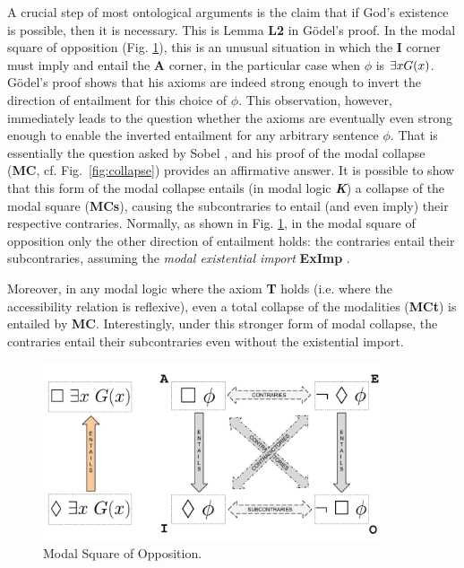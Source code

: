 \documentclass{birkmult}
\theoremstyle{definition}
\theoremstyle{remark}
\numberwithin{equation}{section}
\begin{document}
A crucial step of most ontological arguments is the claim that if
God's existence is possible, then it is necessary.  This is Lemma
\textbf{L2} in G\"odel's proof.  In the modal square of opposition
(Fig. \ref{fig:square}), this is an unusual situation in which the
\textbf{I} corner must imply and entail the \textbf{A} corner, 
in the particular case when $\phi$ is $\exists x G(x)$.  
G\"odel's proof shows that his axioms are indeed 
strong enough to invert the direction of
entailment for this choice of $\phi$.  
This observation, however, immediately leads 
to the question whether the axioms are eventually 
even strong enough to enable the inverted entailment
for any arbitrary sentence $\phi$.  
That is essentially the question asked by 
Sobel \cite{Sobel1987}, and his proof of the modal collapse
(\textbf{MC}, cf. Fig.~\ref{fig:collapse}) 
provides an affirmative answer. It is possible to show
that this form of the modal collapse entails (in modal logic
\textbf{\emph{K}}) a collapse of the modal square (\textbf{MCs}),
causing the subcontraries to entail 
(and even imply) their respective
contraries. Normally, as shown in Fig. \ref{fig:square}, 
in the modal square of opposition only the 
other direction of entailment holds: the
contraries entail their subcontraries, 
assuming the \emph{modal existential import} \textbf{ExImp}
\cite{ExImport}.

Moreover, in any modal logic where the axiom \textbf{T} holds
(i.e. where the accessibility relation is reflexive), 
even a total collapse of the modalities (\textbf{MCt}) 
is entailed by \textbf{MC}.
Interestingly, under this stronger form of modal
collapse, the contraries entail their subcontraries even 
without the existential import.

\begin{figure}[t]
\includegraphics[width=0.9\textwidth]{SquarePics/ModalSquare.png}
\caption{Modal Square of Opposition.}
\label{fig:square}
\end{figure}
\end{document}
